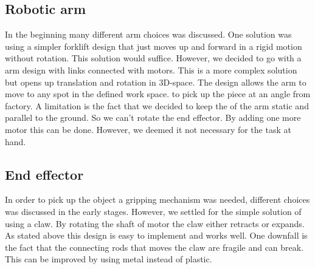 
\subsection{Robotic arm}
In the beginning many different arm choices was discussed. One solution was using a simpler forklift design that just moves up and forward in a rigid motion without rotation.
This solution would suffice. However, we decided to go with a arm design with links connected with motors.
This is a more complex solution but opens up translation and rotation in 3D-space.
The design allows the arm to move to any spot in the defined work space.
to pick up the piece at an angle from factory.
A limitation is the fact that we decided to keep the of the arm static and parallel to the ground.
So we can't rotate the end effector. By adding one more motor this can be done. However, we deemed it not necessary for the task at hand.

\subsection{End effector}
In order to pick up the object a gripping mechanism was needed, different choices was discussed in the early stages.
However, we settled for the simple solution of using a claw.
By rotating the shaft of motor the claw either retracts or expands.
As stated above this design is easy to implement and works well.
One downfall is the fact that the connecting rods that moves the claw are fragile and can break.
This can be improved by using metal instead of plastic. 



